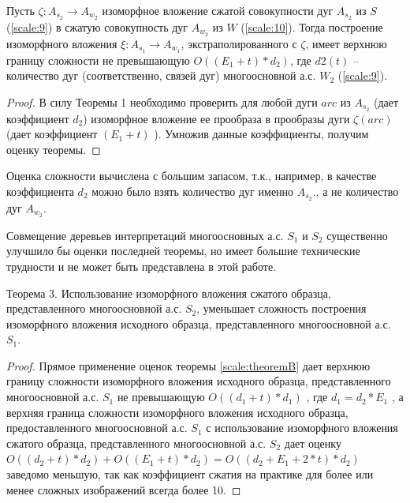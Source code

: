 \begin{theorem}
Пусть  $\zeta : A_{s_2} \to A_{w_2}$  изоморфное вложение сжатой совокупности дуг $A_{s_2}$  из $S$ (\ref{scale:9}) в  сжатую  совокупность дуг $A_{w_2}$ из  $W$ (\ref{scale:10}). Тогда  построение изоморфного вложения  $\xi : A_{s_1} \to A_{w_1}$,   экстраполированного с  $\zeta$, имеет верхнюю границу сложности не превышающую $O((E_1 + t)* d_2)$,  где  $d2(t)$ – количество дуг (соответственно, связей дуг) многоосновной  а.с. $W_2$ (\ref{scale:9}).
\end{theorem}
\begin{proof}
В силу Теоремы 1 необходимо проверить для любой дуги  $arc$  из $A_{s_2}$  (дает коэффициент $d_2$) изоморфное вложение  ее прообраза  в  прообразы дуги $\zeta(arc)$ (дает коэффициент  $(E_1 + t)$ ). Умножив данные коэффициенты,  получим оценку теоремы.                        
\end{proof}           

\begin{remark}
Оценка сложности вычислена с большим запасом, т.к., например, в качестве коэффициента $d_2$  можно было взять количество  дуг именно  $A_{s_2}$., а не количество  дуг  $A_{w_2}$.
\end{remark}

\begin{remark}
Совмещение деревьев интерпретаций   многоосновных  а.с. $S_1$  и  $S_2$ существенно улучшило бы оценки последней теоремы, но имеет большие технические трудности и не может быть представлена  в этой работе.
\end{remark}

\begin{theorem}
Теорема 3.  Использование изоморфного вложения сжатого образца, представленного  многоосновной  а.с. $S_2$,  уменьшает сложность построения изоморфного вложения исходного образца, представленного  многоосновной  а.с.  $S_1$.
\label{scale:theorem:3}
\end{theorem}

\begin{proof}
Прямое применение оценок теоремы \ref{scale:theoremB}  дает верхнюю границу сложности изоморфного вложения исходного образца, представленного  многоосновной  а.с. $S_1$  не превышающую $O((d_1 + t)* d_1)$ , где  $d_1 = d_2 * E_1$ , а верхняя граница  сложности изоморфного вложения исходного образца, предоставленного  многоосновной  а.с.   $S_1$  с использование изоморфного вложения сжатого образца, представленного  многоосновной  а.с.  $S_2$ дает оценку $O((d_2 + t)* d_2) +  O((E_1 + t)* d_2) =  O((d_2 + E_1 + 2 * t ) * d_2 )$ заведомо меньшую, так как коэффициент сжатия на практике для более или менее сложных изображений всегда более 10.
\end{proof}
                  
